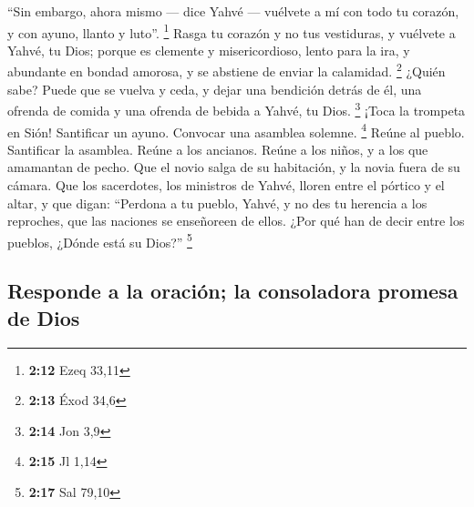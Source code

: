 \begin{paracol}{2}
 ``Sin embargo, ahora mismo --- dice Yahvé --- vuélvete a
mí con todo tu corazón, y con ayuno, llanto y luto''. \footnote{\textbf{2:12}
  Ezeq 33,11}  Rasga tu corazón y no tus vestiduras, y
vuélvete a Yahvé, tu Dios; porque es clemente y misericordioso, lento
para la ira, y abundante en bondad amorosa, y se abstiene de enviar la
calamidad. \footnote{\textbf{2:13} Éxod 34,6}  ¿Quién
sabe? Puede que se vuelva y ceda, y dejar una bendición detrás de él,
una ofrenda de comida y una ofrenda de bebida a Yahvé, tu Dios.
\footnote{\textbf{2:14} Jon 3,9}  ¡Toca la trompeta en
Sión! Santificar un ayuno. Convocar una asamblea solemne. \footnote{\textbf{2:15}
  Jl 1,14}  Reúne al pueblo. Santificar la asamblea.
Reúne a los ancianos. Reúne a los niños, y a los que amamantan de pecho.
Que el novio salga de su habitación, y la novia fuera de su cámara.
 Que los sacerdotes, los ministros de Yahvé, lloren entre
el pórtico y el altar, y que digan: ``Perdona a tu pueblo, Yahvé, y no
des tu herencia a los reproches, que las naciones se enseñoreen de
ellos. ¿Por qué han de decir entre los pueblos, ¿Dónde está su Dios?''
\footnote{\textbf{2:17} Sal 79,10}

\hypertarget{responde-a-la-oraciuxf3n-la-consoladora-promesa-de-dios}{%
\subsection{Responde a la oración; la consoladora promesa de
Dios}\label{responde-a-la-oraciuxf3n-la-consoladora-promesa-de-dios}}


\end{paracol}
